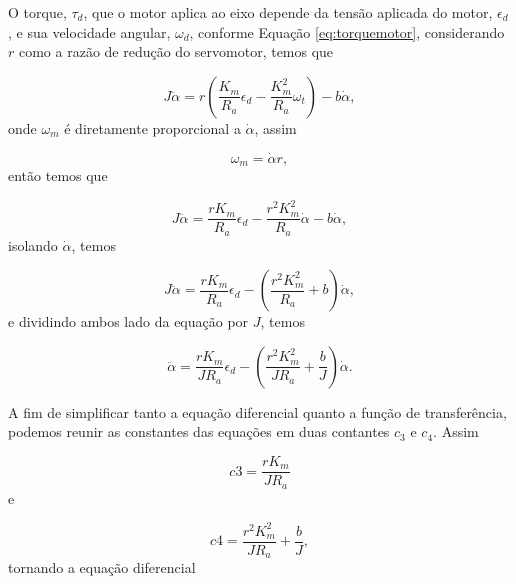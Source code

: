         O torque, $\tau _d$, que o motor aplica ao eixo depende da tensão aplicada do motor, $\epsilon _d$, e sua velocidade angular, $\omega _d$, conforme Equação \eqref{eq:torquemotor}, considerando $r$ como a razão de redução do servomotor, temos que
        
        \begin{equation}
            J \ddot \alpha = r(\frac{K_m}{R_a}\epsilon_d - \frac{K_m^2}{R_a}\omega_t) - b \dot \alpha,
        \end{equation}
        onde $\omega_m$ é diretamente proporcional a $\dot \alpha$, assim
        
        \begin{equation}
            \omega_m = \dot \alpha r,
        \end{equation}
        então temos que
        
        \begin{equation}
            J \ddot \alpha = \frac{r K_m}{R_a}\epsilon_d - \frac{r^2 K_m^2}{R_a}\dot\alpha - b \dot \alpha,
        \end{equation}
        isolando $\dot \alpha$, temos
        
        \begin{equation}
            J \ddot \alpha = \frac{r K_m}{R_a}\epsilon_d - (\frac{r^2  K_m^2}{R_a} + b) \dot \alpha,
        \end{equation}
        e dividindo ambos lado da equação por $J$, temos
        
        \begin{equation}
            \ddot \alpha = \frac{r K_m}{J R_a}\epsilon_d - (\frac{r^2  K_m^2}{J R_a} + \frac{b}{J}) \dot \alpha.
        \end{equation}
        
        A fim de simplificar tanto a equação diferencial quanto a função de transferência, podemos reunir as constantes das equações em duas contantes $c_3$ e $c_4$. Assim
        
        \begin{equation}
            c3 = \frac{r K_m}{J R_a}
        \end{equation}
        e
        
        \begin{equation}
            c4 = \frac{r^2  K_m^2}{J R_a} + \frac{b}{J},
        \end{equation}
        tornando a equação diferencial
        
